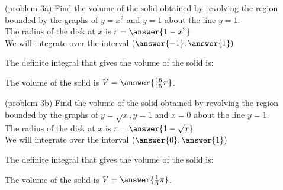 \documentclass[handout]{ximera}
\begin{document}
\begin{example}[example 3]
\begin{image}
\end{image}



\end{example}


\begin{problem}(problem 3a)
Find the volume of the solid obtained by revolving the region bounded by the graphs of $y=x^2$ and $y=1$
about the line $y = 1$.\\

The radius of the disk at $x$ is $r = \answer{1-x^2}$\\
We will integrate over the interval $\left(\answer{-1},\answer{1}\right)$

The definite integral that gives the volume of the solid is:\\
\begin{multipleChoice}
\end{multipleChoice}

The volume of the solid is $V = \answer{\frac{16}{15} \pi }$.


\end{problem}


\begin{problem}(problem 3b)
Find the volume of the solid obtained by revolving the region bounded by the graphs of $y=\sqrt x, y=1$ and $x = 0$
about the line $y=1$.\\

The radius of the disk at $x$ is $r = \answer{1-\sqrt x}$\\
We will integrate over the interval $\left(\answer{0},\answer{1}\right)$

The definite integral that gives the volume of the solid is:\\
\begin{multipleChoice}
\end{multipleChoice}

The volume of the solid is $V = \answer{\frac16 \pi }$.

\end{problem}
\end{document}
